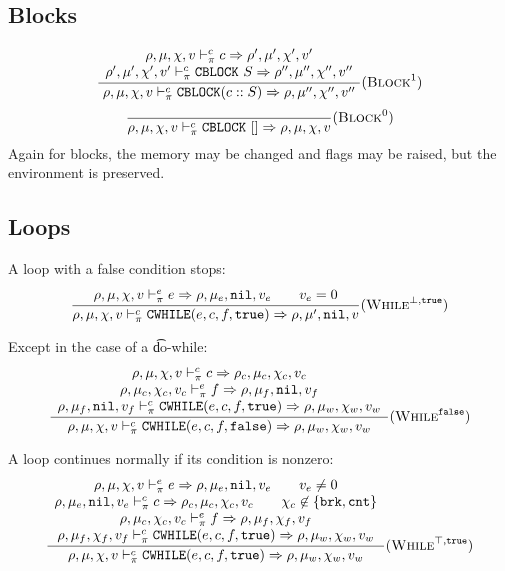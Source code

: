 \subsection{Blocks}
\[\dfrac{\begin{array}{c}
    \rho,\mu,\chi,v \vdash_\pi^c c \Rightarrow \rho',\mu',\chi',v' \\
    \rho',\mu',\chi',v' \vdash_\pi^c \texttt{CBLOCK}\ S \Rightarrow \rho'',\mu'',\chi'',v''
\end{array}}{\rho,\mu,\chi,v \vdash_\pi^c \texttt{CBLOCK}(c :: S) \Rightarrow \rho,\mu'',\chi'',v''} (\textsc{Block}^1)\]
\[\dfrac{}{\rho,\mu,\chi,v \vdash_\pi^c \texttt{CBLOCK}\ [] \Rightarrow \rho,\mu,\chi,v} (\textsc{Block}^0)\]
Again for blocks, the memory may be changed and flags may be raised, but the environment is preserved.\\

\subsection{Loops}

A loop with a false condition stops:
\[\dfrac{\begin{array}{c}
    \rho,\mu,\chi,v \vdash_\pi^e e \Rightarrow \rho,\mu_e,\texttt{nil},v_e \qquad v_e = 0 \\
\end{array}}{\rho,\mu,\chi,v \vdash_\pi^c \texttt{CWHILE}(e, c, f, \texttt{true}) \Rightarrow \rho,\mu',\texttt{nil},v} (\textsc{While}^{\bot,\texttt{true}})\]

Except in the case of a \t{do-while}:
\[\dfrac{\begin{array}{c}
    \rho,\mu,\chi,v \vdash_\pi^c c \Rightarrow \rho_c,\mu_c,\chi_c,v_c \\
    \rho,\mu_c,\chi_c,v_c \vdash_\pi^e f \Rightarrow \rho,\mu_f,\texttt{nil},v_f \\
    \rho,\mu_f,\texttt{nil},v_f \vdash_\pi^c \texttt{CWHILE}(e, c, f, \texttt{true}) \Rightarrow \rho,\mu_w,\chi_w,v_w
\end{array}}{\rho,\mu,\chi,v \vdash_\pi^c \texttt{CWHILE}(e, c, f, \texttt{false}) \Rightarrow \rho,\mu_w,\chi_w,v_w} (\textsc{While}^{\texttt{false}})\]

A loop continues normally if its condition is nonzero:
\[\dfrac{\begin{array}{c}
    \rho,\mu,\chi,v \vdash_\pi^e e \Rightarrow \rho,\mu_e,\texttt{nil},v_e \qquad v_e \ne 0 \\
    \rho,\mu_e,\texttt{nil},v_e \vdash_\pi^c c \Rightarrow \rho_c,\mu_c,\chi_c,v_c \qquad \chi_c\not\in\{ \texttt{brk}, \texttt{cnt} \} \\
    \rho,\mu_c,\chi_c,v_c \vdash_\pi^e f \Rightarrow \rho,\mu_f,\chi_f,v_f \\
    \rho,\mu_f,\chi_f,v_f \vdash_\pi^c \texttt{CWHILE}(e, c, f, \texttt{true}) \Rightarrow \rho,\mu_w,\chi_w,v_w
\end{array}}{\rho,\mu,\chi,v \vdash_\pi^c \texttt{CWHILE}(e, c, f, \texttt{true}) \Rightarrow \rho,\mu_w,\chi_w,v_w} (\textsc{While}^{\top,\texttt{true}})\]

